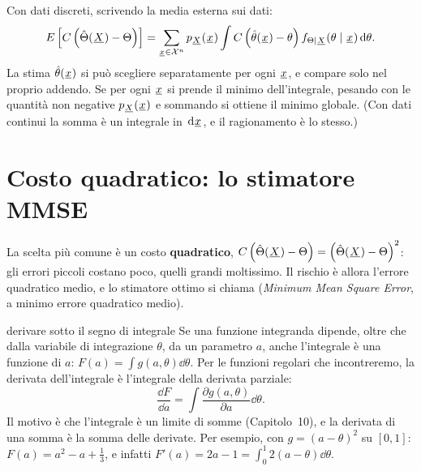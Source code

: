 
\begin{dimostrazione}
 Con dati discreti, scrivendo la media esterna sui dati:
\[ E\left[ C\left( \hat\Theta({\mkern1mu\underline{X}\mkern1mu}) - \Theta \right) \right] = \sum_{{\mkern1mu\underline{x}\mkern1mu} \in \mathcal{X}^n}
   p_{{\mkern1mu\underline{X}\mkern1mu}}({\mkern1mu\underline{x}\mkern1mu}) \int C\left( \hat\theta({\mkern1mu\underline{x}\mkern1mu}) - \theta \right) f_{\Theta \mid {\mkern1mu\underline{X}\mkern1mu}}(\theta \mid
   {\mkern1mu\underline{x}\mkern1mu}) \,\mathrm{d}\theta . \]
 La stima $\hat\theta({\mkern1mu\underline{x}\mkern1mu})$ si può scegliere separatamente per ogni
${\mkern1mu\underline{x}\mkern1mu}$, e compare solo nel proprio addendo. Se per ogni ${\mkern1mu\underline{x}\mkern1mu}$ si prende il minimo dell'integrale, pesando con
le quantità non negative $p_{{\mkern1mu\underline{X}\mkern1mu}}({\mkern1mu\underline{x}\mkern1mu})$ e sommando si ottiene il minimo globale. (Con dati continui la somma è
un integrale in $\,\mathrm{d}{\mkern1mu\underline{x}\mkern1mu}$, e il ragionamento è lo stesso.)
\end{dimostrazione}

\section{Costo quadratico: lo stimatore MMSE}

La scelta più comune è un costo \textbf{quadratico}, $C\left( \hat\Theta({\mkern1mu\underline{X}\mkern1mu}) - \Theta \right) = \left(
\hat\Theta({\mkern1mu\underline{X}\mkern1mu}) - \Theta \right)^2$: gli errori piccoli costano poco, quelli grandi moltissimo. Il rischio è
allora l'errore quadratico medio, e lo stimatore ottimo si chiama  (\emph{Minimum Mean Square
Error}, a minimo errore quadratico medio).

\begin{richiamo}{derivare sotto il segno di integrale}
Se una funzione integranda dipende, oltre che dalla variabile di integrazione $\theta$, da un parametro $a$, anche
l'integrale è una funzione di $a$: $F(a) = \int g(a, \theta) \dd\theta$. Per le funzioni regolari che incontreremo, la
derivata dell'integrale è l'integrale della derivata parziale:
\[ \frac{\dd F}{\dd a} = \int \frac{\partial g(a, \theta)}{\partial a} \dd\theta . \]
Il motivo è che l'integrale è un limite di somme (Capitolo~10), e la derivata di una somma è la somma delle derivate.
Per esempio, con $g = (a - \theta)^2$ su $[0, 1]$: $F(a) = a^2 - a + \frac13$, e infatti $F'(a) = 2a - 1 = \int_0^1 2(a
- \theta) \dd\theta$.
\end{richiamo}

